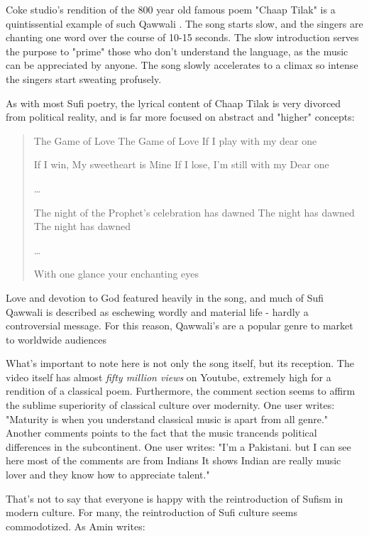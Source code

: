 \documentclass{article}
\begin{document}
  Coke studio's rendition of the 800 year old famous poem "Chaap Tilak" is a
  quintissential example of such Qawwali \autocite{Chaaptilaak}. The song starts
  slow, and the singers are chanting one word over the course of 10-15 seconds.
  The slow introduction serves the purpose to "prime" those who don't understand
  the language, as the music can be appreciated by anyone. The song slowly
  accelerates to a climax so intense the singers start sweating profusely. 

  As with most Sufi poetry, the lyrical content of Chaap Tilak is very divorced from 
  political reality, and is far more focused on abstract and "higher" concepts:

  \begin{quote}
    
    The Game of Love
    The Game of Love
    If I play with my dear one

    If I win, My sweetheart is Mine
    If I lose, I'm still with my Dear one

    \dots

    The night of the Prophet's celebration has dawned
    The night has dawned
    The night has dawned

    \dots

    With one glance your enchanting eyes

  \end{quote}

  Love and devotion to God featured heavily in the song, and much of Sufi
  Qawwali is described as eschewing wordly and material life - hardly a
  controversial message. For this reason, Qawwali's are a popular genre to
  market to worldwide audiences

  What's important to note here is not only the song itself, but its reception. 
  The video itself has almost \textit{fifty million views} on Youtube, extremely
  high for a rendition of a classical poem. Furthermore, the comment section
  seems to affirm the sublime superiority of classical culture over modernity.
  One user writes: "Maturity is when you understand classical music is apart
  from all genre." Another comments points to the fact that the music trancends political
  differences in the subcontinent. One user writes: "I'm a Pakistani. but I can
  see here most of the comments are from Indians It shows Indian are really
  music lover and they know how to appreciate talent." 

  That's not to say that everyone is happy with the reintroduction of Sufism in modern culture. 
  For many, the reintroduction of Sufi culture seems commodotized. As Amin writes: 
  
\end{document}
